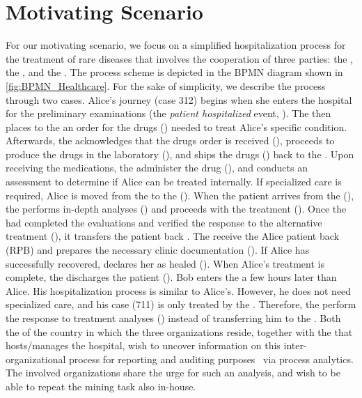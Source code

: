 \section{Motivating Scenario}\label{sec:motivating}
For our motivating scenario, we focus on a simplified hospitalization process for the treatment of rare diseases that involves the cooperation of three parties: the , the , and the . The process scheme is depicted in the BPMN diagram shown in \cref{fig:BPMN_Healthcare}. For the sake of simplicity, we describe the process through two cases. Alice's journey (case 312) begins when she enters the hospital for the preliminary examinations (the \emph{patient hospitalized} event, ). The  then places to the  an order for the drugs () needed to treat Alice's specific condition. Afterwards, the  acknowledges that the drugs order is received (), proceeds to produce the drugs in the laboratory (), and ships the drugs () back to the . Upon receiving the medications, the  administer the drug (), and conducts an assessment to determine if Alice can be treated internally. If specialized care is required, Alice is moved from the  to the  (). When the patient arrives from the  (), the  performs in-depth analyses () and proceeds with the treatment (). Once the  had completed the evaluations and verified the response to the alternative treatment (), it transfers the patient back . The  receive the Alice patient back \Activ(RPB) and prepares the necessary clinic documentation (). If Alice has successfully recovered, declares her as healed (). When Alice's treatment is complete, the  discharges the patient (). Bob enters the  a few hours later than Alice. His hospitalization process is similar to Alice's. However, he does not need specialized care, and his case (711) is only treated by the . Therefore, the  perform the response to treatment analyses () instead of transferring him to the . Both the  of the country in which the three organizations reside, together with the  that hosts/manages the hospital, wish to uncover information on this inter-organizational process for reporting and auditing purposes~\cite{MiekeJans} via process analytics. The involved organizations share the urge for such an analysis, and wish to be able to repeat the mining task also in-house. 
